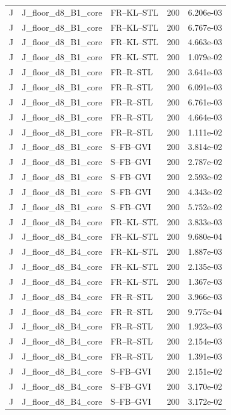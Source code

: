 \begin{tabular}{lllrr}
J & J_floor_d8_B1_core & FR--KL--STL & 200 & 6.206e-03 \\
J & J_floor_d8_B1_core & FR--KL--STL & 200 & 6.767e-03 \\
J & J_floor_d8_B1_core & FR--KL--STL & 200 & 4.663e-03 \\
J & J_floor_d8_B1_core & FR--KL--STL & 200 & 1.079e-02 \\
J & J_floor_d8_B1_core & FR--R--STL & 200 & 3.641e-03 \\
J & J_floor_d8_B1_core & FR--R--STL & 200 & 6.091e-03 \\
J & J_floor_d8_B1_core & FR--R--STL & 200 & 6.761e-03 \\
J & J_floor_d8_B1_core & FR--R--STL & 200 & 4.664e-03 \\
J & J_floor_d8_B1_core & FR--R--STL & 200 & 1.111e-02 \\
J & J_floor_d8_B1_core & S--FB--GVI & 200 & 3.814e-02 \\
J & J_floor_d8_B1_core & S--FB--GVI & 200 & 2.787e-02 \\
J & J_floor_d8_B1_core & S--FB--GVI & 200 & 2.593e-02 \\
J & J_floor_d8_B1_core & S--FB--GVI & 200 & 4.343e-02 \\
J & J_floor_d8_B1_core & S--FB--GVI & 200 & 5.752e-02 \\
J & J_floor_d8_B4_core & FR--KL--STL & 200 & 3.833e-03 \\
J & J_floor_d8_B4_core & FR--KL--STL & 200 & 9.680e-04 \\
J & J_floor_d8_B4_core & FR--KL--STL & 200 & 1.887e-03 \\
J & J_floor_d8_B4_core & FR--KL--STL & 200 & 2.135e-03 \\
J & J_floor_d8_B4_core & FR--KL--STL & 200 & 1.367e-03 \\
J & J_floor_d8_B4_core & FR--R--STL & 200 & 3.966e-03 \\
J & J_floor_d8_B4_core & FR--R--STL & 200 & 9.775e-04 \\
J & J_floor_d8_B4_core & FR--R--STL & 200 & 1.923e-03 \\
J & J_floor_d8_B4_core & FR--R--STL & 200 & 2.154e-03 \\
J & J_floor_d8_B4_core & FR--R--STL & 200 & 1.391e-03 \\
J & J_floor_d8_B4_core & S--FB--GVI & 200 & 2.151e-02 \\
J & J_floor_d8_B4_core & S--FB--GVI & 200 & 3.170e-02 \\
J & J_floor_d8_B4_core & S--FB--GVI & 200 & 3.172e-02 \\

\end{tabular}
